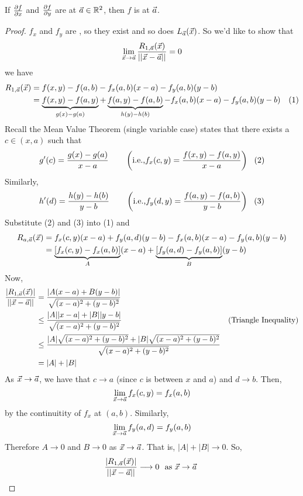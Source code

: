 \documentclass[english, 11pt]{article}
\begin{document}
\begin{thrm}\label{pdifcont}
  If $\frac{\partial f}{\partial x}$ and $\frac{\partial f}{\partial y}$ are  at $\vec{a} \in {\mathbb{R}}^2$, then $f$ is  at $\vec{a}$.
\end{thrm}

\begin{proof}
  $f_x$ and $f_y$ are , so they exist and so does $L_{\vec{a}}(\vec{x})$. So we'd like to show that
  \[ \lim_{\vec{x} \rightarrow \vec{a}} \frac{R_{1,\vec{a}}(\vec{x})}{||\vec{x} - \vec{a}||} = 0 \]
  we have
  \begin{align*}
    R_{1,\va}(\vx) & = f(x,y) - f(a,b) - f_x(a,b)(x-a) - f_y(a,b)(y-b) \\
                   & = \ub{f(x,y) - f(a,y)}_{g(x) - g(a)} + \ub{f(a,y) - f(a,b)}_{h(y) - h(b)} - f_x(a,b)(x-a) - f_y(a,b)(y-b) \ \ \ (1)
  \end{align*}
  Recall the Mean Value Theorem (single variable case) states that there exists a $c \in (x,a)$ such that
  \[ g'(c) = \f{g(x) - g(a)}{x-a} \ \ \ \ \ \ \left(\mbox{i.e.,} f_x(c,y) = \f{f(x,y)-f(a,y)}{x-a} \right) \ \ (2) \]
  Similarly,
  \[ h'(d) = \frac{h(y) - h(b)}{y-b} \ \ \ \ \ \ \left(\mbox{i.e.,} f_y(d,y) = \frac{f(a,y)-f(a,b)}{y-b} \right) \ \ (3) \]
  Substitute (2) and (3) into (1) and
  \begin{align*}
    R_{a, \vec{a}}(\vec{x})  & = f_x(c,y)(x-a) + f_y(a,d)(y-b) - f_x(a,b)(x-a)-f_y(a,b)(y-b) \\
                     & = \underbrace{[f_x(c,y) - f_x(a,b)]}_A(x-a) + \underbrace{[f_y(a,d) - f_y(a,b)]}_B(y-b)
  \end{align*}
  Now,
  \begin{align*}
    \frac{|R_{1,\vec{a}}(\vec{x})|}{||\vec{x} - \vec{a}||} & = \frac{|A(x-a) + B(y-b)|}{\sqrt{(x-a)^2 + (y-b)^2}} \\
                                        & \leq \frac{|A||x-a| + |B||y-b|}{\sqrt{(x-a)^2 + (y-b)^2}} & \mbox{(Triangle Inequality)} \\
                                        & \leq \frac{|A|\sqrt{(x-a)^2 + (y-b)^2} + |B|\sqrt{(x-a)^2 + (y-b)^2}}{\sqrt{(x-a)^2 + (y-b)^2}} \\
                                        & = |A| + |B|
  \end{align*}
  As $\vec{x} \rightarrow \vec{a}$, we have that $c \rightarrow a$ (since $c$ is between $x$ and $a$) and $d \rightarrow b$. Then,
  \[ \lim_{\vec{x} \rightarrow \vec{a}} f_x(c,y) = f_x(a,b) \]
  by the continuitity of $f_x$ at $(a,b)$. Similarly,
  \[ \lim_{\vec{x} \rightarrow \vec{a}} f_y(a,d) = f_y(a,b) \]
  Therefore $A \rightarrow 0$ and $B \rightarrow 0$ as $\vec{x} \rightarrow \vec{a}$. That is, $|A| + |B| \rightarrow 0$. So,
  \[ \frac{|R_{1,\vec{a}}(\vec{x})|}{||\vec{x} - \vec{a}||} \longrightarrow 0 \mbox{ \ as $\vec{x} \rightarrow \vec{a}$ } \]
\end{proof}
\end{document}
